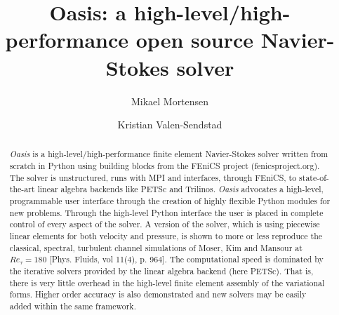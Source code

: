 \documentclass[final,3p,times,twocolumn]{elsarticle}
\begin{document}
\begin{frontmatter}



\title{Oasis: a high-level/high-performance open source Navier-Stokes solver}


\author[a,b]{Mikael Mortensen}
\address[a]{University of Oslo, Moltke Moes vei 35, 0851 Oslo, Norway}
\address[b]{Center for Biomedical Computing at Simula Research Laboratory, P.O.Box 134, N-1325 Lysaker, Norway}
\author[b,c]{Kristian Valen-Sendstad}

\address[c]{University of Toronto, 5 Kings College Road, Toronto, ON, Canada}


\begin{abstract}
\emph{Oasis} is a high-level/high-performance finite element Navier-Stokes solver written from scratch in Python using building blocks from the FEniCS project (fenicsproject.org). The solver is unstructured, runs with MPI and interfaces, through FEniCS, to state-of-the-art linear algebra backends like PETSc and Trilinos. \emph{Oasis} advocates a high-level, programmable user interface through the creation of highly flexible Python modules for new problems. Through the high-level Python interface the user is placed in complete control of every aspect of the solver. A version of the solver, which is using piecewise linear elements for both velocity and pressure, is shown to more or less reproduce the classical, spectral, turbulent channel simulations of Moser, Kim and Mansour at $Re_{\tau}=180$ [Phys. Fluids, vol 11(4), p. 964].  The computational speed is dominated by the iterative solvers provided by the linear algebra backend (here PETSc). That is, there is very little overhead in the high-level finite element assembly of the variational forms. Higher order accuracy is also demonstrated and new solvers may be easily added within the same framework.


\end{abstract}
\end{frontmatter}
\end{document}
